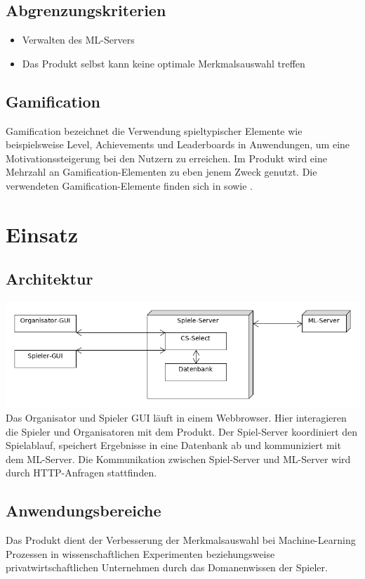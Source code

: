 \documentclass[a4paper]{scrreprt}
\begin{document}
    \section{Abgrenzungskriterien}
    \begin{itemize}
        \item Verwalten des \Gls{ML-Server}s
	    \item Das Produkt selbst kann keine optimale Merkmalsauswahl treffen
    \end{itemize}

    \section{Gamification}
    \label{sec:gamification}
    Gamification bezeichnet die Verwendung spieltypischer Elemente wie beispielsweise Level, Achievements und Leaderboards in Anwendungen, um eine Motivationssteigerung bei den Nutzern zu erreichen.
    Im \Gls{Produkt} wird eine Mehrzahl an Gamification-Elementen zu eben jenem Zweck genutzt.
    Die verwendeten Gamification-Elemente finden sich in  sowie .

    
    \chapter{Einsatz}

    \section{Architektur}
    \includegraphics[width=\textwidth]{uml/export/Architektur.png}
    Das Organisator und Spieler GUI läuft in einem Webbrowser. Hier interagieren die Spieler und Organisatoren mit dem \Gls{Produkt}. Der \Gls{Spiel-Server} koordiniert den Spielablauf, speichert Ergebnisse
    in eine Datenbank ab und kommuniziert mit dem ML-Server. Die Kommunikation zwischen Spiel-Server und ML-Server wird durch HTTP-Anfragen stattfinden.
    \section{Anwendungsbereiche}
    Das \Gls{Produkt} dient der Verbesserung der Merkmalsauswahl bei Machine-Learning Prozessen in wissenschaftlichen
    Experimenten beziehungsweise privatwirtschaftlichen Unternehmen durch das \Gls{Domanenwissen} der \Gls{Spieler}.
\end{document}
